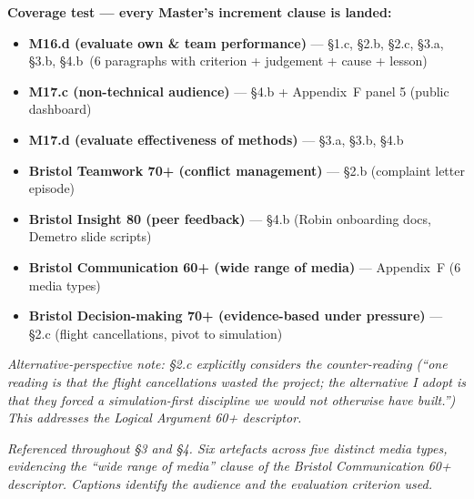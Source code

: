 \vspace{0.5em}
\noindent\textbf{Coverage test — every Master's increment clause is landed:}

\begin{itemize}\setlength\itemsep{0pt}
  \item \textbf{M16.d (evaluate own \& team performance)} — §1.c, §2.b, §2.c, §3.a, §3.b, §4.b\ (6 paragraphs with criterion + judgement + cause + lesson)
  \item \textbf{M17.c (non-technical audience)} — §4.b + Appendix~F panel 5 (public dashboard)
  \item \textbf{M17.d (evaluate effectiveness of methods)} — §3.a, §3.b, §4.b
  \item \textbf{Bristol Teamwork 70+ (conflict management)} — §2.b (complaint letter episode)
  \item \textbf{Bristol Insight 80 (peer feedback)} — §4.b (Robin onboarding docs, Demetro slide scripts)
  \item \textbf{Bristol Communication 60+ (wide range of media)} — Appendix~F (6 media types)
  \item \textbf{Bristol Decision-making 70+ (evidence-based under pressure)} — §2.c (flight cancellations, pivot to simulation)
\end{itemize}

\noindent\textit{Alternative-perspective note: §2.c explicitly considers the counter-reading
(``one reading is that the flight cancellations wasted the project; the alternative I
adopt is that they forced a simulation-first discipline we would not otherwise have
built.'') This addresses the Logical Argument 60+ descriptor.}

\newpage

\noindent\textit{Referenced throughout §3 and §4. Six artefacts across five distinct
media types, evidencing the ``wide range of media'' clause of the Bristol Communication
60+ descriptor. Captions identify the audience and the evaluation criterion used.}

\vspace{0.5em}

